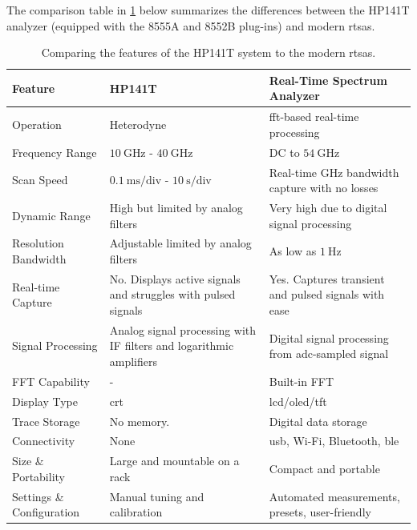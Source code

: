 \documentclass[class=report,11pt,crop=false]{standalone}
\begin{document}
	The comparison table in \ref{tab:comparing-old-to-modern} below summarizes the differences between the HP141T analyzer (equipped with the 8555A and 8552B plug-ins) and modern \acrshort{rtsa}s.
	
	 \begin{table}[ht!]
	 	\centering
	 	\begin{tabular}{|m{8em}|m{15em}|m{15em}|}
	 		\hline
	 		\cellcolor{cyan!25}\textbf{Feature}	& \cellcolor{cyan!25}\textbf{HP141T}	& \cellcolor{cyan!25}\textbf{Real-Time Spectrum Analyzer}\\
	 		\hline
	 		Operation &	Heterodyne	&	\acrshort{fft}-based real-time processing\\
	 		\hline
	 		Frequency Range &	$\SI{10}{\giga\hertz}$	- $\SI{40}{\giga\hertz}$	&	DC to $\SI{54}{\giga\hertz}$\\
	 		\hline
	 		Scan Speed &	$\SI{0.1}{\milli\second}/\text{div}$ - $\SI{10}{\second}/\text{div}$	&		Real-time GHz bandwidth capture with no losses\\
	 		\hline
	 		Dynamic Range	&	High but limited by analog filters	& Very high due to digital signal processing\\
	 		\hline
	 		Resolution Bandwidth	&	Adjustable limited by analog filters	&	As low as $\SI{1}{\hertz}$\\
	 		\hline
	 		Real-time Capture	&	No. Displays active signals and struggles with pulsed signals &	Yes. Captures transient and pulsed signals with ease\\
	 		\hline
	 		Signal Processing	&	Analog signal processing with IF filters and logarithmic amplifiers	& Digital signal processing from \acrshort{adc}-sampled signal\\
	 		\hline
	 		FFT Capability	&	- &	Built-in FFT \\
	 		\hline
	 		Display Type	&	\acrshort{crt}	&	\acrshort{lcd}/\acrshort{oled}/\acrshort{tft}\\
	 		\hline
	 		Trace Storage	&	No memory. &	Digital data storage\\
	 		\hline
	 		Connectivity	&	None &	\acrshort{usb}, Wi-Fi, Bluetooth, \acrshort{ble}\\
	 		\hline
	 		Size \& Portability	&	Large and mountable on a rack &	Compact and portable\\
	 		\hline
	 		Settings \& Configuration	&	Manual tuning and calibration	&	Automated measurements, presets, user-friendly\\
	 		\hline
	 	\end{tabular}
 		\caption{Comparing the features of the HP141T system to the modern \acrshort{rtsa}s.}
 		\label{tab:comparing-old-to-modern}
	 \end{table}
	
\end{document}
